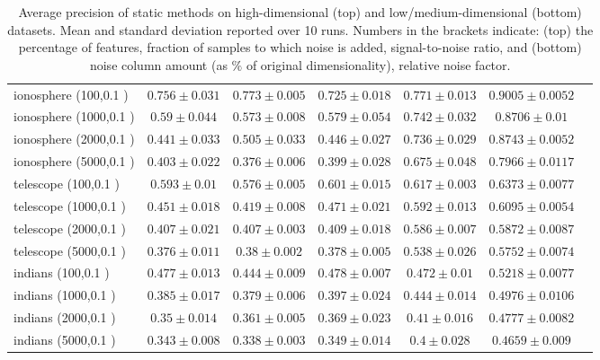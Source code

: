 \begin{footnotesize}
\begin{table}[p!]
\begin{tabular}{lcccccc}
ionosphere (100,0.1 )& $0.756 \pm 0.031$ &  $0.773 \pm 0.005$ &  $0.725 \pm 0.018$ &  $0.771 \pm 0.013$ &  $0.9005 \pm 0.0052$    \\
ionosphere (1000,0.1 )& $0.59 \pm 0.044$ &  $0.573 \pm 0.008$ &  $0.579 \pm 0.054$ &  $0.742 \pm 0.032$ &  $0.8706 \pm 0.01$    \\
ionosphere (2000,0.1 )& $0.441 \pm 0.033$ &  $0.505 \pm 0.033$ &  $0.446 \pm 0.027$ &  $0.736 \pm 0.029$ &  $0.8743 \pm 0.0052$    \\
ionosphere (5000,0.1 )& $0.403 \pm 0.022$ &  $0.376 \pm 0.006$ &  $0.399 \pm 0.028$ &  $0.675 \pm 0.048$ &  $0.7966 \pm 0.0117$    \\
\midrule
telescope (100,0.1 )& $0.593 \pm 0.01$ &  $0.576 \pm 0.005$ &  $0.601 \pm 0.015$ &  $0.617 \pm 0.003$ &  $0.6373 \pm 0.0077$    \\
telescope (1000,0.1 )& $0.451 \pm 0.018$ &  $0.419 \pm 0.008$ &  $0.471 \pm 0.021$ &  $0.592 \pm 0.013$ &  $0.6095 \pm 0.0054$    \\
telescope (2000,0.1 )& $0.407 \pm 0.021$ &  $0.407 \pm 0.003$ &  $0.409 \pm 0.018$ &  $0.586 \pm 0.007$ &  $0.5872 \pm 0.0087$    \\
telescope (5000,0.1 )& $0.376 \pm 0.011$ &  $0.38 \pm 0.002$ &  $0.378 \pm 0.005$ &  $0.538 \pm 0.026$ &  $0.5752 \pm 0.0074$    \\
\midrule
indians (100,0.1 )& $0.477 \pm 0.013$ &  $0.444 \pm 0.009$ &  $0.478 \pm 0.007$ &  $0.472 \pm 0.01$ &  $0.5218 \pm 0.0077$    \\
indians (1000,0.1 )& $0.385 \pm 0.017$ &  $0.379 \pm 0.006$ &  $0.397 \pm 0.024$ &  $0.444 \pm 0.014$ &  $0.4976 \pm 0.0106$    \\
indians (2000,0.1 )& $0.35 \pm 0.014$ &  $0.361 \pm 0.005$ &  $0.369 \pm 0.023$ &  $0.41 \pm 0.016$ &  $0.4777 \pm 0.0082$    \\
indians (5000,0.1 )& $0.343 \pm 0.008$ &  $0.338 \pm 0.003$ &  $0.349 \pm 0.014$ &  $0.4 \pm 0.028$ &  $0.4659 \pm 0.009$    \\
				\bottomrule
		\end{tabular}
		\caption{Average precision of static methods on high-dimensional (top) and low/medium-dimensional (bottom) datasets. Mean and standard deviation reported over 10 runs. Numbers in the brackets indicate: (top) the percentage of features, fraction of samples to which noise is added, signal-to-noise ratio, and (bottom) noise column amount (as $\%$ of original dimensionality), relative noise factor.}
		\label{table:static-results}
\end{table}
\end{footnotesize}


